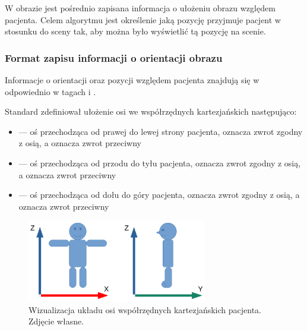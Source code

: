 \label{sec:algorithm-imageorientationindicator}

W obrazie \DICOM jest pośrednio zapisana informacja o ułożeniu obrazu względem pacjenta.
Celem algorytmu jest określenie jaką pozycję przyjmuje pacjent w stosunku do sceny tak, aby można było wyświetlić tą pozycję na scenie.

\subsubsection{Format zapisu informacji o orientacji obrazu}

\par
Informacje o orientacji oraz pozycji względem pacjenta znajdują się w odpowiednio w tagach  i .

\par
Standard \DICOM zdefiniował ułożenie osi we współrzędnych kartezjańskich następująco:
\begin{itemize}
    \item {} --- oś przechodząca od prawej do lewej strony pacjenta,  oznacza zwrot zgodny z osią, a  oznacza zwrot przeciwny

    \item {} --- oś przechodząca od przodu do tyłu pacjenta,  oznacza zwrot zgodny z osią, a  oznacza zwrot przeciwny

    \item {} --- oś przechodząca od dołu do góry pacjenta,  oznacza zwrot zgodny z osią, a  oznacza zwrot przeciwny

\end{itemize}

\begin{figure}[!htbp]
    \centering
    \includegraphics[width=0.7\textwidth]{img/imageorientationindicator-003.pdf}
    \caption{Wizualizacja układu osi współrzędnych kartezjańskich pacjenta. Zdjęcie własne.}
    \label{fig:imageorientationindicator2}
\end{figure}


